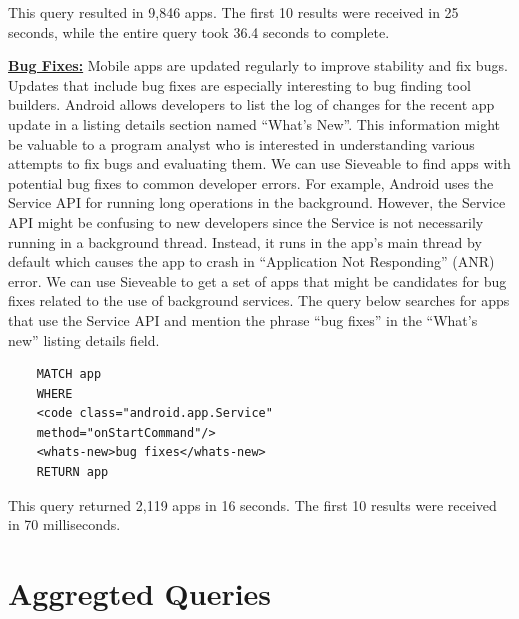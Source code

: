 This query resulted in 9,846 apps. The first 10 results were received in 25 seconds, while the entire query took 36.4 seconds to complete.

\underline{\textbf{{Bug Fixes:}}}
Mobile apps are updated regularly to improve stability and fix bugs.
Updates that include bug fixes are especially interesting to bug finding tool builders.
Android allows developers to list the log of changes for the recent app update in a listing details section named ``What's New''.
This information might be valuable to a program analyst who is interested in understanding various attempts to fix bugs and evaluating them.
We can use Sieveable to find apps with potential bug fixes to common developer errors.
For example, Android uses the Service API for running long operations in the background.
However, the Service API might be confusing to new developers since the Service is not necessarily running in a background thread.
Instead, it runs in the app's main thread by default which causes the app to crash in ``Application Not Responding'' (ANR) error.
We can use Sieveable to get a set of apps that might be candidates for bug fixes related to the use of background services. The query below searches for apps that use the Service API and mention the phrase ``bug fixes'' in the ``What's new'' listing details field.

\begin{verbatim}
	MATCH app
	WHERE
	<code class="android.app.Service"
	method="onStartCommand"/>
	<whats-new>bug fixes</whats-new> 
	RETURN app
\end{verbatim}

This query returned 2,119 apps in 16 seconds. The first 10 results were received in 70 milliseconds.


\section{Aggregted Queries}


